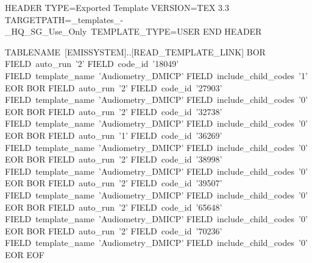 HEADER
TYPE=Exported Template
VERSION=TEX 3.3
TARGETPATH=\Live_templates_-_HQ_SG_Use_Only\Audio\
TEMPLATE_TYPE=USER
END HEADER

TABLENAME~[EMISSYSTEM]..[READ_TEMPLATE_LINK]
  BOR
    FIELD~auto_run~'2'
    FIELD~code_id~'18049'
    FIELD~template_name~'Audiometry_DMICP'
    FIELD~include_child_codes~'1'
  EOR
  BOR
    FIELD~auto_run~'2'
    FIELD~code_id~'27903'
    FIELD~template_name~'Audiometry_DMICP'
    FIELD~include_child_codes~'0'
  EOR
  BOR
    FIELD~auto_run~'2'
    FIELD~code_id~'32738'
    FIELD~template_name~'Audiometry_DMICP'
    FIELD~include_child_codes~'0'
  EOR
  BOR
    FIELD~auto_run~'1'
    FIELD~code_id~'36269'
    FIELD~template_name~'Audiometry_DMICP'
    FIELD~include_child_codes~'0'
  EOR
  BOR
    FIELD~auto_run~'2'
    FIELD~code_id~'38998'
    FIELD~template_name~'Audiometry_DMICP'
    FIELD~include_child_codes~'0'
  EOR
  BOR
    FIELD~auto_run~'2'
    FIELD~code_id~'39507'
    FIELD~template_name~'Audiometry_DMICP'
    FIELD~include_child_codes~'0'
  EOR
  BOR
    FIELD~auto_run~'2'
    FIELD~code_id~'65648'
    FIELD~template_name~'Audiometry_DMICP'
    FIELD~include_child_codes~'0'
  EOR
  BOR
    FIELD~auto_run~'2'
    FIELD~code_id~'70236'
    FIELD~template_name~'Audiometry_DMICP'
    FIELD~include_child_codes~'0'
  EOR
EOF

